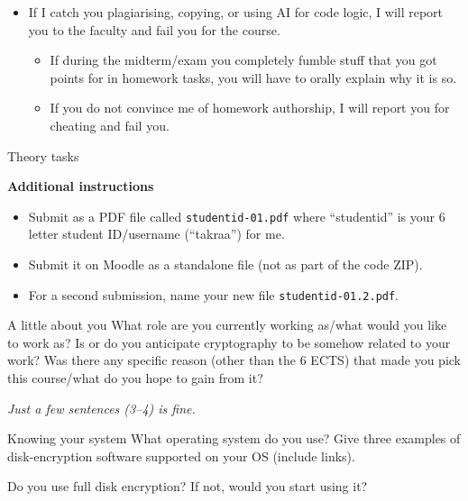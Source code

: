 \documentclass{homework}
\begin{document}
\begin{itemize}
\begin{itemize}
    \item I recommend that you ask in the server/me instead of using AI
  \end{itemize}
  \item If I catch you plagiarising, copying, or using AI for code logic, I will report you to the faculty and fail you for the course.
  \begin{itemize}
    \item If during the midterm/exam you completely fumble stuff that you got points for in homework tasks, you will have to orally explain why it is so.
    \item If you do not convince me of homework authorship, I will report you for cheating and fail you.
  \end{itemize}
\end{itemize}

\newpage

\begin{center}
  Theory tasks
\end{center}

\textbf{Additional instructions}

\begin{itemize}
  \item Submit as a PDF file called \texttt{studentid-01.pdf} where \enquote{studentid} is your 6 letter student ID/username (\enquote{takraa}) for me.
  \item Submit it on Moodle as a standalone file (not as part of the code ZIP).
  \item For a second submission, name your new file \texttt{studentid-01.2.pdf}.
\end{itemize}

\begin{task}{A little about you}
  What role are you currently working as/what would you like to work as?
  Is or do you anticipate cryptography to be somehow related to your work?
  Was there any specific reason (other than the 6 ECTS) that made you pick this course/what do you hope to gain from it?

  \textit{Just a few sentences (3--4) is fine.}
\end{task}

\begin{task}{Knowing your system}
  What operating system do you use? Give three examples of disk-encryption software supported on your OS (include links).

  Do you use full disk encryption? If not, would you start using it?
\end{task}
\end{document}
